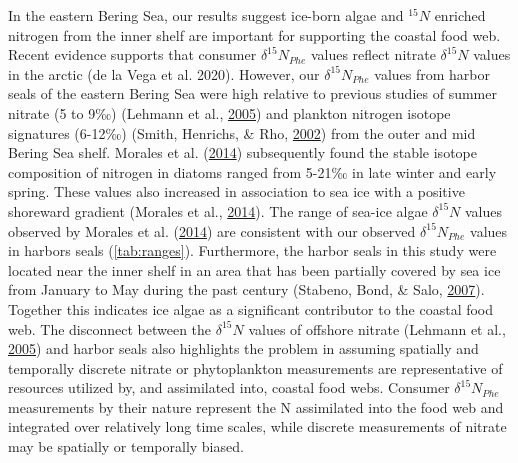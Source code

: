 \documentclass [11pt, proquest] {uwthesis}[2015/03/03]
\begin{document}
In the eastern Bering Sea, our results suggest ice-born algae and
\(^{15}N\) enriched nitrogen from the inner shelf are important for
supporting the coastal food web. Recent evidence supports that consumer
\(\delta^{15}N_{Phe}\) values reflect nitrate \(\delta^{15}N\) values in
the arctic (de la Vega et al. 2020). However, our \(\delta^{15}N_{Phe}\)
values from harbor seals of the eastern Bering Sea were high relative to
previous studies of summer nitrate (5 to 9‰) (Lehmann et al.,
\protect\hyperlink{ref-Lehmann2005}{2005}) and plankton nitrogen isotope
signatures (6-12‰) (Smith, Henrichs, \& Rho,
\protect\hyperlink{ref-Smith2002}{2002}) from the outer and mid Bering
Sea shelf. Morales et al. (\protect\hyperlink{ref-Morales2014}{2014})
subsequently found the stable isotope composition of nitrogen in diatoms
ranged from 5-21‰ in late winter and early spring. These values also
increased in association to sea ice with a positive shoreward gradient
(Morales et al., \protect\hyperlink{ref-Morales2014}{2014}). The range
of sea-ice algae \(\delta^{15}N\) values observed by Morales et al.
(\protect\hyperlink{ref-Morales2014}{2014}) are consistent with our
observed \(\delta^{15}N_{Phe}\) values in harbors seals
(\ref{tab:ranges}). Furthermore, the harbor seals in this study were
located near the inner shelf in an area that has been partially covered
by sea ice from January to May during the past century (Stabeno, Bond,
\& Salo, \protect\hyperlink{ref-Stabeno2007}{2007}). Together this
indicates ice algae as a significant contributor to the coastal food
web. The disconnect between the \(\delta^{15}N\) values of offshore
nitrate (Lehmann et al., \protect\hyperlink{ref-Lehmann2005}{2005}) and
harbor seals also highlights the problem in assuming spatially and
temporally discrete nitrate or phytoplankton measurements are
representative of resources utilized by, and assimilated into, coastal
food webs. Consumer \(\delta^{15}N_{Phe}\) measurements by their nature
represent the N assimilated into the food web and integrated over
relatively long time scales, while discrete measurements of nitrate may
be spatially or temporally biased.
\end{document}
